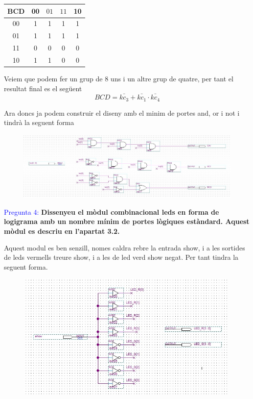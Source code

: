 \documentclass[12pt, a4papre]{article}
\begin{document}
	\begin{center}
	\begin{tabular}{c|| c c c c} 
	 BCD & 00 & $01$ &$11$ & 10\\ [0.5ex] 
	 \hline\hline
	 00 & 1 & 1 & 1 & 1\\ 

	 01 & 1 & 1  & 1 & 1\\

	 11 & 0 & 0 & 0 & 0\\

	 10 & 1 & 1 & 0 & 0\\
	\end{tabular}
	\end{center}
	
	Veiem que podem fer un grup de 8 uns i un altre grup de quatre, per tant el resultat final es el següent
	\[BCD = \bar{kc_3} + \bar{kc_1}\cdot \bar{kc_4}\]
	
	Ara doncs ja podem construir el diseny amb el minim de portes and, or i not i tindrà la seguent forma
	\begin{figure}[H]
		\begin{center}
		\includegraphics[width=130mm]{sel.jpeg}
		\end{center}
	\end{figure}
	
	\textcolor{blue}{Pregunta 4:} \textbf{Dissenyeu el mòdul combinacional leds en forma de logigrama amb un nombre mínim de portes lògiques estàndard. Aquest mòdul es descriu en l’apartat 3.2.}
	
	Aquest modul es ben senzill, nomes caldra rebre la entrada show, i a les sortides de leds vermells treure show, i a les de led verd show negat. Per tant tindra la seguent forma.
	\begin{figure}[H]
		\begin{center}
		\includegraphics[width=110mm]{leds.jpeg}
		\end{center}
	\end{figure}
	
\end{document}
